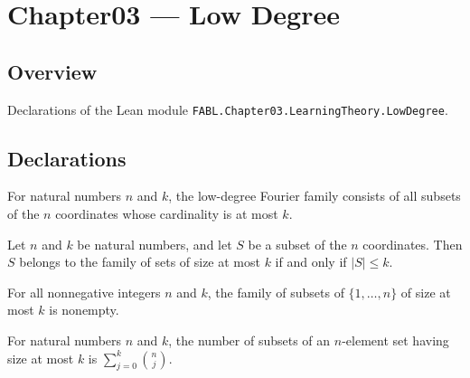 \chapter{Chapter03 — Low Degree}
\section{Overview}

Declarations of the Lean module \texttt{FABL.Chapter03.LearningTheory.LowDegree}.

\section{Declarations}

\begin{definition}
\label{FABL.lowDegreeFourierFamily}
\leanok
For natural numbers $n$ and $k$, the low-degree Fourier family consists of all subsets
of the $n$ coordinates whose cardinality is at most $k$.
\end{definition}

\begin{theorem}
\label{FABL.mem_lowDegreeFourierFamily}
\leanok
{}
Let $n$ and $k$ be natural numbers, and let $S$ be a subset of the $n$ coordinates. Then
$S$ belongs to the family of sets of size at most $k$ if and only if $|S|\le k$.
\end{theorem}

\begin{theorem}
\label{FABL.lowDegreeFourierFamily_nonempty}
\leanok
{}
For all nonnegative integers $n$ and $k$, the family of subsets of $\{1,\ldots,n\}$ of
size at most $k$ is nonempty.
\end{theorem}

\begin{theorem}
\label{FABL.card_lowDegreeFourierFamily_eq_sum_choose}
\leanok
{}
For natural numbers $n$ and $k$, the number of subsets of an $n$-element set having size
at most $k$ is $\sum_{j=0}^{k}\binom{n}{j}$.
\end{theorem}

